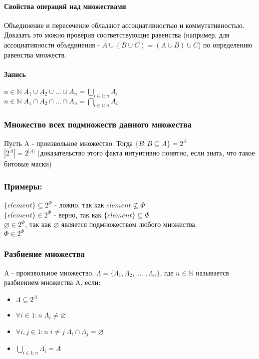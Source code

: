 \paragraph{Свойства операций над множествами}
$\;$ \\ Объединение и пересечение обладают ассоциативностью и коммутативностью. Доказать это можно проверив соответствующие равенства (например, для ассоциативности объединения - $A \cup (B \cup C) = (A \cup B) \cup C$) по определению равенства множеств.
\paragraph{Запись}
$\;$ \\ $n \in \mathbb{N} \; A_1 \cup A_2 \cup ... \cup A_n = \bigcup\limits_{i \in 1:n} A_i$\\
$n \in \mathbb{N} \; A_1 \cap A_2 \cap ... \cap A_n = \bigcap\limits_{i \in 1:n} A_i$ \\
\subsubsection{Множество всех подмножеств данного множества}
$\;$ \\ Пусть A - произвольное множество. Тогда $\{B : B \subseteq A\} = 2^{A}$\\
$|2^{A}| = 2^{|A|}$ (доказательство этого факта интуитивно понятно, если знать, что такое битовые маски)
\subsubsection{Примеры:}
$\;$ \\ $\{element\} \subseteq 2^{\Phi}$ - ложно, так как $element \not\subseteq \Phi$\\
$\{element\} \in 2^{\Phi}$ - верно, так как $\{element\} \subseteq \Phi$ \\
$\varnothing \in 2^{\Phi}$, так как $\varnothing$ является подмножеством любого множества. \\
$\Phi \in 2^{\Phi}$
\subsubsection{Разбиение множества}
$\;$ \\ A - произвольное множество. $\Lambda = \{\Lambda_1, \Lambda_2, \; ... \; , \Lambda_n\}$, где $n \in \mathbb{N}$ называется разбиением множества A, если:\\
\begin{itemize}
\item $\Lambda \subseteq 2^{A}$
\item $\forall i \in 1 : n \; \Lambda_{i} \not= \varnothing$
\item $\forall i, j \in 1 : n \; i \not= j \; \Lambda_{i} \cap \Lambda_{j} = \varnothing$
\item $\bigcup\limits_{i \in 1 : n}\Lambda_{i} = A$
\end{itemize}
